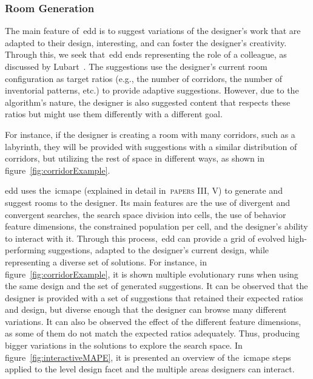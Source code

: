 \subsubsection{Room Generation}

The main feature of~\acrshort{edd} is to suggest variations of the designer's work that are adapted to their design, interesting, and can foster the designer's creativity. Through this, we seek that~\acrshort{edd} ends representing the role of a colleague, as discussed by Lubart~\cite{lubart_how_2005}. The suggestions use the designer's current room configuration as target ratios (e.g., the number of corridors, the number of inventorial patterns, etc.) to provide adaptive suggestions. However, due to the algorithm's nature, the designer is also suggested content that respects these ratios but might use them differently with a different goal.

For instance, if the designer is creating a room with many corridors, such as a labyrinth, they will be provided with suggestions with a similar distribution of corridors, but utilizing the rest of space in different ways, as shown in figure~\ref{fig:corridorExample}.

\acrshort{edd} uses the~\acrshort{icmape} (explained in detail in~\textsc{papers III, V}) to generate and suggest rooms to the designer. Its main features are the use of divergent and convergent searches, the search space division into cells, the use of behavior feature dimensions, the constrained population per cell, and the designer's ability to interact with it. Through this process,~\acrshort{edd} can provide a grid of evolved high-performing suggestions, adapted to the designer's current design, while representing a diverse set of solutions. For instance, in figure~\ref{fig:corridorExample}, it is shown multiple evolutionary runs when using the same design and the set of generated suggestions. It can be observed that the designer is provided with a set of suggestions that retained their expected ratios and design, but diverse enough that the designer can browse many different variations. It can also be observed the effect of the different feature dimensions, as some of them do not match the expected ratios adequately. Thus, producing bigger variations in the solutions to explore the search space. In figure~\ref{fig:interactiveMAPE}, it is presented an overview of the~\acrshort{icmape} steps applied to the level design facet and the multiple areas designers can interact.


